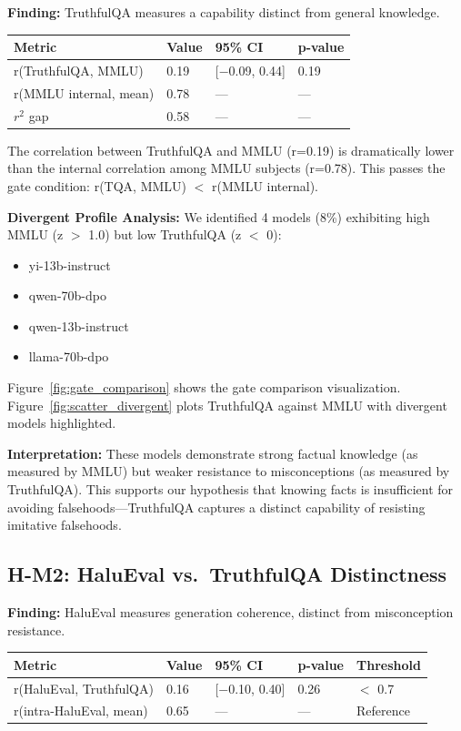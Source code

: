 \textbf{Finding:} TruthfulQA measures a capability distinct from general knowledge.

\begin{table}[h]
\centering
\begin{tabular}{@{}llll@{}}
\toprule
\textbf{Metric} & \textbf{Value} & \textbf{95\% CI} & \textbf{p-value} \\
\midrule
r(TruthfulQA, MMLU) & 0.19 & [$-$0.09, 0.44] & 0.19 \\
r(MMLU internal, mean) & 0.78 & --- & --- \\
$r^2$ gap & 0.58 & --- & --- \\
\bottomrule
\end{tabular}
\end{table}

The correlation between TruthfulQA and MMLU (r=0.19) is dramatically lower than the internal correlation among MMLU subjects (r=0.78). This passes the gate condition: r(TQA, MMLU) $<$ r(MMLU internal).

\textbf{Divergent Profile Analysis:} We identified 4 models (8\%) exhibiting high MMLU (z $>$ 1.0) but low TruthfulQA (z $<$ 0):
\begin{itemize}
\item yi-13b-instruct
\item qwen-70b-dpo
\item qwen-13b-instruct
\item llama-70b-dpo
\end{itemize}

Figure~\ref{fig:gate_comparison} shows the gate comparison visualization. Figure~\ref{fig:scatter_divergent} plots TruthfulQA against MMLU with divergent models highlighted.

\textbf{Interpretation:} These models demonstrate strong factual knowledge (as measured by MMLU) but weaker resistance to misconceptions (as measured by TruthfulQA). This supports our hypothesis that knowing facts is insufficient for avoiding falsehoods---TruthfulQA captures a distinct capability of resisting imitative falsehoods.

\subsection{H-M2: HaluEval vs.\ TruthfulQA Distinctness}

\textbf{Finding:} HaluEval measures generation coherence, distinct from misconception resistance.

\begin{table}[h]
\centering
\begin{tabular}{@{}lllll@{}}
\toprule
\textbf{Metric} & \textbf{Value} & \textbf{95\% CI} & \textbf{p-value} & \textbf{Threshold} \\
\midrule
r(HaluEval, TruthfulQA) & 0.16 & [$-$0.10, 0.40] & 0.26 & $<$ 0.7 \\
r(intra-HaluEval, mean) & 0.65 & --- & --- & Reference \\
\bottomrule
\end{tabular}
\end{table}

